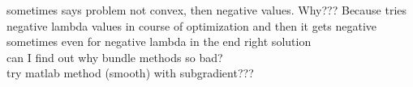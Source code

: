 sometimes says problem not convex, then negative values. Why??? Because tries negative lambda values in course of optimization and then it gets negative \\
sometimes even for negative lambda in the end right solution \\
can I find out why bundle methods so bad? \\
try matlab method (smooth) with subgradient???









